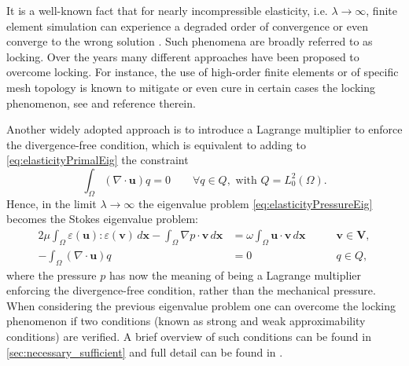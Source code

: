 \documentclass[USenglish]{article}
\theoremstyle{dgthm}
\theoremstyle{dgdef}
\let\vec\bm
\begin{document}
It is a well-known fact that for nearly incompressible elasticity, i.e. $\lambda\to \infty$, finite element simulation can experience a degraded order of convergence or even converge to the wrong solution \cite{AinsworthParker,BabuskaSuri, BBF}. Such phenomena are broadly referred to as locking. Over the years many different approaches have been proposed to overcome locking.
For instance, the use of high-order finite elements or of specific mesh topology is known to mitigate or even cure in certain cases the locking phenomenon, see \cite{AinsworthParker, BabuskaSuri, BBF} and reference therein.

Another widely adopted approach is to introduce a Lagrange multiplier to enforce the divergence-free condition, which is equivalent to adding to \eqref{eq:elasticityPrimalEig} the constraint
\begin{equation}
  \label{eq:lagrangeMultiplier}
  \int_\Omega (\nabla\cdot \vec{u})q = 0 \qquad \forall  q\in Q, \text{ with } Q=L^2_0(\Omega).
\end{equation}
Hence, in the limit $\lambda\to \infty $ the eigenvalue problem \eqref{eq:elasticityPressureEig} becomes the Stokes eigenvalue problem:
\begin{equation}
  \label{eq:stokes}
  \begin{aligned}
    2\mu \int_\Omega \varepsilon(\vec{u}):\varepsilon(\vec{v})\, d\vec{x}-\int_\Omega \nabla p \cdot \vec{v}\, d\vec{x} &= \omega \int_\Omega \vec{u}\cdot \vec{v}\, d\vec{x} \qquad &\vec{v}\in \vec{V},\\
    -\int_\Omega (\nabla\cdot \vec{u})q &= 0 \qquad&q \in Q,
  \end{aligned}
\end{equation}
where the pressure $p$ has now the meaning of being a Lagrange multiplier enforcing the divergence-free condition, rather than the mechanical pressure.
When considering the previous eigenvalue problem one can overcome the locking phenomenon if two conditions (known as strong and weak approximability conditions) are verified.
A brief overview of such conditions can be found in \cref{sec:necessary_sufficient} and full detail can be found in \cite{BBG, BBF}.
\end{document}
